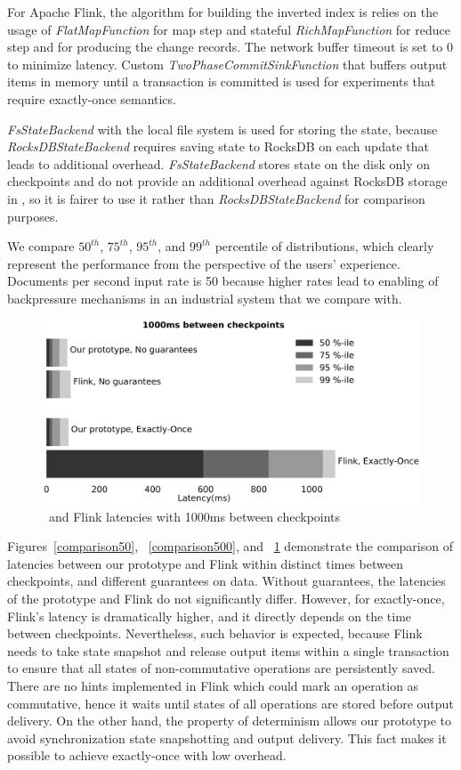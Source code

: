 For Apache Flink, the algorithm for building the inverted index is relies on the usage of {\it FlatMapFunction} for map step and stateful {\it RichMapFunction} for reduce step and for producing the change records. The network buffer timeout is set to 0 to minimize latency. Custom {\it TwoPhaseCommitSinkFunction} that buffers output items in memory until a transaction is committed is used for experiments that require exactly-once semantics. 

{\it FsStateBackend} with the local file system is used for storing the state, because {\it RocksDBStateBackend} requires saving state to RocksDB on each update that leads to additional overhead. {\it FsStateBackend} stores state on the disk only on checkpoints and do not provide an additional overhead against RocksDB storage in \FlameStream, so it is fairer to use it rather than {\it RocksDBStateBackend} for comparison purposes.

We compare $50^{th}$, $75^{th}$, $95^{th}$, and $99^{th}$ percentile of distributions, which clearly represent the performance from the perspective of the users' experience. Documents per second input rate is 50 because higher rates lead to enabling of backpressure mechanisms in an industrial system that we compare with.

\begin{figure}[t]
  \centering
  \includegraphics[width=.8\textwidth]{Chapters/DeterministicModelRuntime/pics/comparison1000}
  \caption{\FlameStream\ and Flink latencies with 1000ms between checkpoints}
  \label{comparison1000}
\end{figure}

Figures~\ref{comparison50}, ~\ref{comparison500}, and ~\ref{comparison1000} demonstrate      the comparison of latencies between our prototype and Flink within distinct times between checkpoints, and different guarantees on data. Without guarantees, the latencies of the prototype and Flink do not significantly differ. However, for exactly-once, Flink's latency is dramatically higher, and it directly depends on the time between checkpoints. Nevertheless, such behavior is expected, because Flink needs to take state snapshot and release output items within a single transaction to ensure that all states of non-commutative operations are persistently saved. There are no hints implemented in Flink which could mark an operation as commutative, hence it waits until states of all operations are stored before output delivery. 
On the other hand, the property of determinism allows our prototype to avoid synchronization state snapshotting and output delivery. This fact makes it possible to achieve exactly-once with low overhead.
